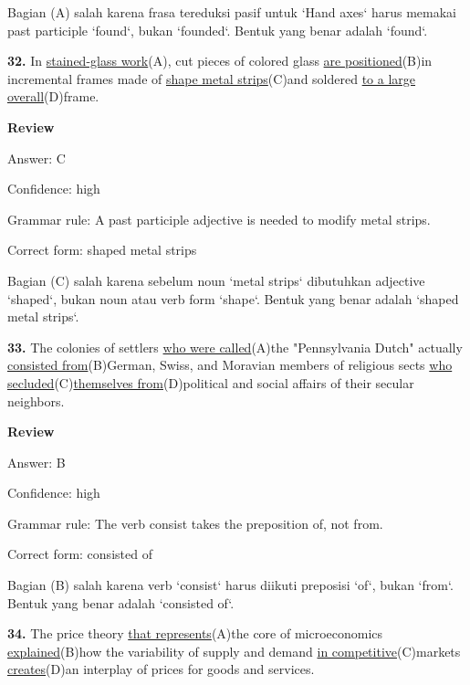\documentclass[12pt]{article}
\begin{document}
Bagian (A) salah karena frasa tereduksi pasif untuk `Hand axes` harus memakai past participle `found`, bukan `founded`. Bentuk yang benar adalah `found`.\par
\endgroup
\par
\vspace{\questionblockgap}
\noindent\textbf{32.} In \uline{stained-glass work}(A), cut pieces of colored glass \uline{are positioned}(B)in incremental frames made of \uline{shape metal strips}(C)and soldered \uline{to a large overall}(D)frame.
\par
\begingroup
\setlength{\parskip}{0pt}
\setlength{\parindent}{0pt}
\textbf{Review}\par
Answer: C\par
Confidence: high\par
Grammar rule: A past participle adjective is needed to modify metal strips.\par
Correct form: shaped metal strips\par
Bagian (C) salah karena sebelum noun `metal strips` dibutuhkan adjective `shaped`, bukan noun atau verb form `shape`. Bentuk yang benar adalah `shaped metal strips`.\par
\endgroup
\par
\vspace{\questionblockgap}
\noindent\textbf{33.} The colonies of settlers \uline{who were called}(A)the "Pennsylvania Dutch" actually \uline{consisted from}(B)German, Swiss, and Moravian members of religious sects \uline{who secluded}(C)\uline{themselves from}(D)political and social affairs of their secular neighbors.
\par
\begingroup
\setlength{\parskip}{0pt}
\setlength{\parindent}{0pt}
\textbf{Review}\par
Answer: B\par
Confidence: high\par
Grammar rule: The verb consist takes the preposition of, not from.\par
Correct form: consisted of\par
Bagian (B) salah karena verb `consist` harus diikuti preposisi `of`, bukan `from`. Bentuk yang benar adalah `consisted of`.\par
\endgroup
\par
\vspace{\questionblockgap}
\noindent\textbf{34.} The price theory \uline{that represents}(A)the core of microeconomics \uline{explained}(B)how the variability of supply and demand \uline{in competitive}(C)markets \uline{creates}(D)an interplay of prices for goods and services.
\end{document}
